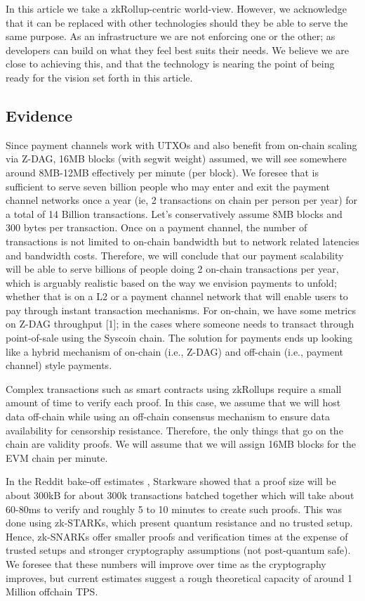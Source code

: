\documentclass[peerreview]{ieeesyscoin}
\begin{document}
In this article we take a zkRollup-centric world-view. However, we acknowledge that it can be replaced with other technologies should they be able to serve the same purpose. As an infrastructure we are not enforcing one or the other; as developers can build on what they feel best suits their needs. We believe we are close to achieving this, and that the technology is nearing the point of being ready for the vision set forth in this article.

\subsection{Evidence}

Since payment channels work with UTXOs and also benefit from on-chain scaling via Z-DAG, 16MB blocks (with segwit weight) assumed, we will see somewhere around 8MB-12MB effectively per minute (per block). We foresee that is sufficient to serve seven billion people who may enter and exit the payment channel networks once a year (ie, 2 transactions on chain per person per year) for a total of 14 Billion transactions. Let’s conservatively assume 8MB blocks and 300 bytes per transaction. Once on a payment channel, the number of transactions is not limited to on-chain bandwidth but to network related latencies and bandwidth costs. Therefore, we will conclude that our payment scalability will be able to serve billions of people doing 2 on-chain transactions per year, which is arguably realistic based on the way we envision payments to unfold; whether that is on a L2 or a payment channel network that will enable users to pay through instant transaction mechanisms. For on-chain, we have some metrics on Z-DAG throughput [1]; in the cases where someone needs to transact through point-of-sale using the Syscoin chain. The solution for payments ends up looking like a hybrid mechanism of on-chain (i.e., Z-DAG) and off-chain (i.e., payment channel) style payments.

Complex transactions such as smart contracts using zkRollups require a small amount of time to verify each proof. In this case, we assume that we will host data off-chain while using an off-chain consensus mechanism to ensure data availability for censorship resistance. Therefore, the only things that go on the chain are validity proofs. We will assume that we will assign 16MB blocks for the EVM chain per minute. 

In the Reddit bake-off estimates \cite{Sta20a}, Starkware showed that a proof size will be about 300kB for about 300k transactions batched together which will take about 60-80ms to verify and roughly 5 to 10 minutes to create such proofs. This was done using zk-STARKs, which present quantum resistance and no trusted setup.  Hence, zk-SNARKs offer smaller proofs and verification times at the expense of trusted setups and stronger cryptography assumptions (not post-quantum safe). We foresee that these numbers will improve over time as the cryptography improves, but current estimates suggest a rough theoretical capacity of around 1 Million offchain TPS. 
\end{document}
